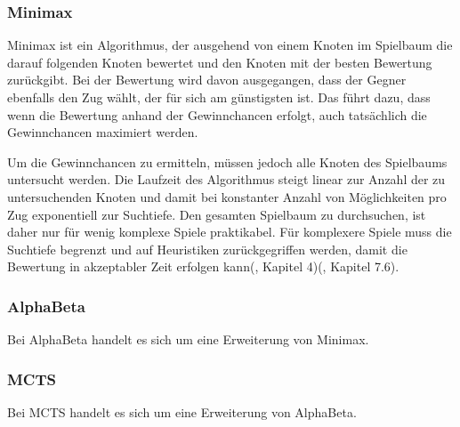 
\subsubsection{Minimax}

Minimax ist ein Algorithmus, der ausgehend von einem Knoten im Spielbaum die darauf folgenden Knoten bewertet und den Knoten mit der besten Bewertung zurückgibt. Bei der Bewertung wird davon ausgegangen, dass der Gegner ebenfalls den Zug wählt, der für sich am günstigsten ist. Das führt dazu, dass wenn die Bewertung anhand der Gewinnchancen erfolgt, auch tatsächlich die Gewinnchancen maximiert werden.

Um die Gewinnchancen zu ermitteln, müssen jedoch alle Knoten des Spielbaums untersucht werden. Die Laufzeit des Algorithmus steigt linear zur Anzahl der zu untersuchenden Knoten und damit bei konstanter Anzahl von Möglichkeiten pro Zug exponentiell zur Suchtiefe. Den gesamten Spielbaum zu durchsuchen, ist daher nur für wenig komplexe Spiele praktikabel. Für komplexere Spiele muss die Suchtiefe begrenzt und auf Heuristiken zurückgegriffen werden, damit die Bewertung in akzeptabler Zeit erfolgen kann(\cite{Ferguson.January2019}, Kapitel 4)(\cite{Heineman.October2008}, Kapitel 7.6).

\subsubsection{AlphaBeta}

Bei AlphaBeta handelt es sich um eine Erweiterung von Minimax.

\subsubsection{MCTS}

Bei MCTS handelt es sich um eine Erweiterung von AlphaBeta.